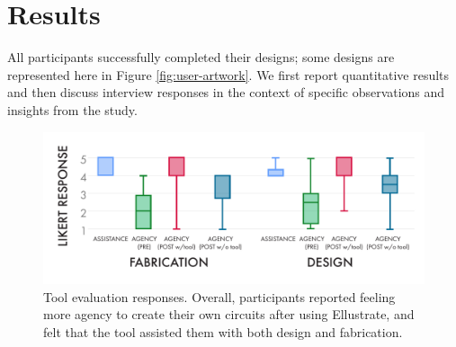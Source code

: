 \documentclass{sigchi}
\begin{document}
\section{Results}
All participants successfully completed their designs; some designs are represented here in Figure \ref{fig:user-artwork}. 
We first report quantitative results and then discuss interview responses in the context of specific observations and insights from the study.

\begin{figure}[t]
\centering
\includegraphics[width=1.0\columnwidth]{charts/boxplots_quant.pdf}
\caption{Tool evaluation responses. Overall, participants reported feeling more agency to create their own circuits after using Ellustrate, and felt that the tool assisted them with both design and fabrication.}
\label{fig:fab_tool_results}
\vspace{-20pt}
\end{figure}
\end{document}
